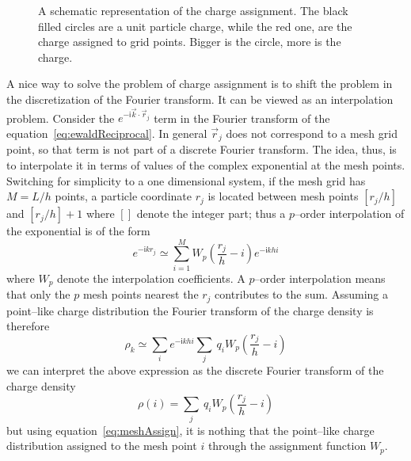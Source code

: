 \begin{figure}
	\caption{A schematic representation of the charge assignment. The black filled circles are a unit particle charge, while the red one, are the charge assigned to grid points. Bigger is the circle, more is the charge.}
	\label{fig:gidAssign}
\end{figure}

A nice way to solve the problem of charge assignment is to shift the problem in the discretization of the Fourier transform. It can be viewed as an interpolation problem. Consider the $e^{-\mathsf{i}\vec k\cdot \vec r_j}$ term in the Fourier transform of the equation~\eqref{eq:ewaldReciprocal}. In general $\vec r_j$ does not correspond to a mesh grid point, so that term is not part of a discrete Fourier transform. The idea, thus, is to interpolate it in terms of values of the complex exponential at the mesh points. Switching for simplicity to a one dimensional system, if the mesh grid has $M = L/h$ points, a particle coordinate $r_j$ is located between mesh points $[r_j/h]$ and $[r_j/h] + 1$ where $[]$ denote the integer part; thus a $p$--order interpolation of the exponential is of the form
\begin{equation*}
	e^{-\mathsf{i}kr_j} \simeq \sum_{i=1}^M W_{p}\left ( \frac{r_j}{h} - i \right ) e^{-\mathsf{i}khi}
\end{equation*}
where $W_{p}$ denote the interpolation coefficients. A $p$--order interpolation means that only the $p$ mesh points nearest the $r_j$ contributes to the sum. Assuming a point--like charge distribution the Fourier transform of the charge density is therefore
\begin{equation*}
	\rho_k \simeq \sum_{i}e^{-\mathsf{i}khi} \sum_j\ q_iW_{p} \left ( \frac{r_j}{h} - i \right )
\end{equation*}
we can interpret the above expression as the discrete Fourier transform of the charge density
\begin{equation*}
	\rho(i) = \sum_j\ q_iW_{p} \left ( \frac{r_j}{h} - i \right )
\end{equation*}
but using equation~\eqref{eq:meshAssign}, it is nothing that the point--like charge distribution assigned to the mesh point $i$ through the assignment function $W_{p}$.

